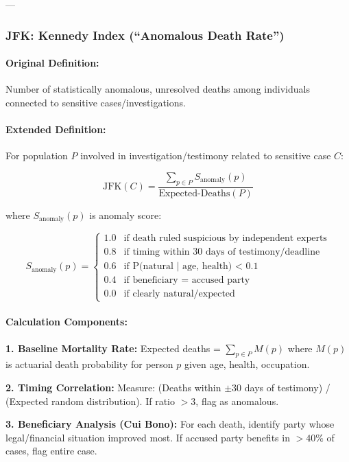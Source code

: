 \documentclass[11pt,a4paper]{article}
\theoremstyle{definition}
\theoremstyle{remark}
\begin{document}
---

\subsubsection{JFK: Kennedy Index (``Anomalous Death Rate'')}

\paragraph{Original Definition:}
Number of statistically anomalous, unresolved deaths among individuals connected to sensitive cases/investigations.

\paragraph{Extended Definition:}
For population $P$ involved in investigation/testimony related to sensitive case $C$:

\[
\text{JFK}(C) = \frac{\sum_{p \in P} S_{\text{anomaly}}(p)}{\text{Expected-Deaths}(P)}
\]

where $S_{\text{anomaly}}(p)$ is anomaly score:

\[
S_{\text{anomaly}}(p) = \begin{cases}
1.0 & \text{if death ruled suspicious by independent experts} \\
0.8 & \text{if timing within 30 days of testimony/deadline} \\
0.6 & \text{if P(natural | age, health) < 0.1} \\
0.4 & \text{if beneficiary = accused party} \\
0.0 & \text{if clearly natural/expected}
\end{cases}
\]

\paragraph{Calculation Components:}

\textbf{1. Baseline Mortality Rate:}
Expected deaths = $\sum_{p \in P} M(p)$ where $M(p)$ is actuarial death probability for person $p$ given age, health, occupation.

\textbf{2. Timing Correlation:}
Measure: (Deaths within $\pm30$ days of testimony) / (Expected random distribution). If ratio $> 3$, flag as anomalous.

\textbf{3. Beneficiary Analysis (Cui Bono):}
For each death, identify party whose legal/financial situation improved most. If accused party benefits in $>40\%$ of cases, flag entire case.
\end{document}
